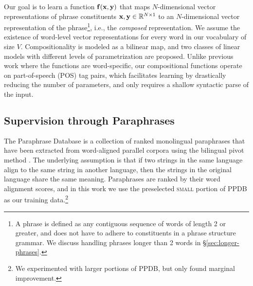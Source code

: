 \documentclass[11pt,letterpaper]{article}
\newcommand{\bX}{{\bf x}}
\newcommand{\bY}{{\bf y}}
\newcommand{\bF}{{\bf f}}
\begin{document}
Our goal is to learn a function $\bF (\bX, \bY)$ that maps $N$-dimensional vector representations of phrase constituents $\bX, \bY \in \mathbb{R}^{N \times 1}$  to an $N$-dimensional vector representation of the phrase\footnote{A phrase is defined as any contiguous sequence of words of length 2 or greater, and does not have to adhere to constituents in a phrase structure grammar. We discuss handling phrases longer than 2 words in \S\ref{sec:longer-phrases}.}, i.e., the \emph{composed} representation. 
We assume the existence of word-level vector representations for every word in our vocabulary of size $V$.
Compositionality is modeled as a bilinear map, and two classes of linear models with different levels of parametrization are proposed.  
Unlike previous work \cite[\emph{inter alia}]{Baroni2010,Socher2012,Grefenstette2013} where the functions are  word-specific, our compositional functions operate on part-of-speech (POS) tag pairs, which facilitates learning by drastically reducing the number of parameters, and only requires a shallow syntactic parse of the input. 

\subsection{Supervision through Paraphrases}
\label{sec:ppdb}

The Paraphrase Database \cite[PPDB]{Ganitkevich2013} is a collection of ranked monolingual paraphrases that have been extracted from word-aligned parallel corpora using the bilingual pivot method \cite{Bannard2005}. 
The underlying assumption is that if two strings in the same language align to the same string in another language, then the strings in the original language share the same meaning. 
Paraphrases are ranked by their word alignment scores, and in this work we use the preselected \textsc{small} portion of PPDB as our training data.\footnote{We experimented with larger portions of PPDB, but only found marginal improvement.}
\end{document}
